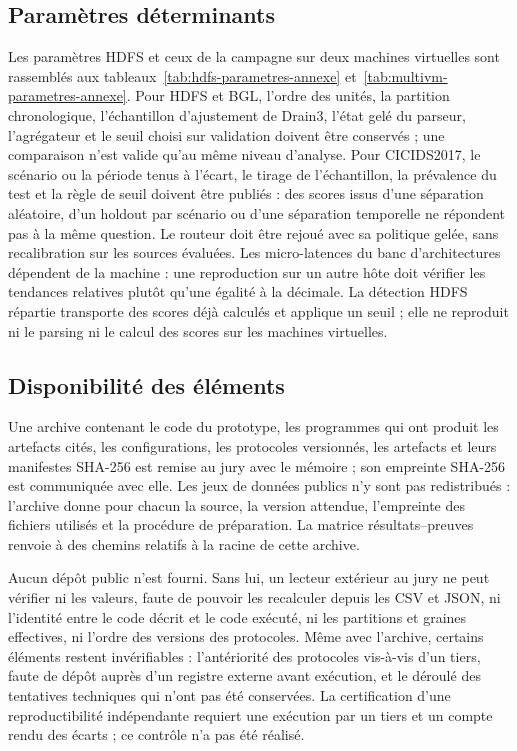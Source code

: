 \subsection{Paramètres déterminants}

Les paramètres HDFS et ceux de la campagne sur deux machines virtuelles sont rassemblés aux
tableaux~\ref{tab:hdfs-parametres-annexe} et~\ref{tab:multivm-parametres-annexe}. Pour HDFS
et BGL, l'ordre des unités, la partition chronologique, l'échantillon d'ajustement de
Drain3, l'état gelé du parseur, l'agrégateur et le seuil choisi sur validation doivent être
conservés ; une comparaison n'est valide qu'au même niveau d'analyse. Pour CICIDS2017, le
scénario ou la période tenus à l'écart, le tirage de l'échantillon, la prévalence du test et
la règle de seuil doivent être publiés : des scores issus d'une séparation aléatoire, d'un
holdout par scénario ou d'une séparation temporelle ne répondent pas à la même question. Le
routeur doit être rejoué avec sa politique gelée, sans recalibration sur les sources
évaluées. Les micro-latences du banc d'architectures dépendent de la machine : une
reproduction sur un autre hôte doit vérifier les tendances relatives plutôt qu'une égalité à
la décimale. La détection HDFS répartie transporte des scores déjà calculés et applique un
seuil ; elle ne reproduit ni le parsing ni le calcul des scores sur les machines virtuelles.

\subsection{Disponibilité des éléments}
\label{sec:disponibilite}

Une archive contenant le code du prototype, les programmes qui ont produit les artefacts
cités, les configurations, les protocoles versionnés, les artefacts et leurs manifestes
SHA-256 est remise au jury avec le mémoire ; son empreinte SHA-256 est communiquée avec
elle. Les jeux de données publics n'y sont pas redistribués : l'archive donne pour chacun la
source, la version attendue, l'empreinte des fichiers utilisés et la procédure de
préparation. La matrice résultats--preuves renvoie à des chemins relatifs à la racine de
cette archive.

Aucun dépôt public n'est fourni. Sans lui, un lecteur extérieur au jury ne peut vérifier ni
les valeurs, faute de pouvoir les recalculer depuis les CSV et JSON, ni l'identité entre le
code décrit et le code exécuté, ni les partitions et graines effectives, ni l'ordre des
versions des protocoles. Même avec l'archive, certains éléments restent invérifiables :
l'antériorité des protocoles vis-à-vis d'un tiers, faute de dépôt auprès d'un registre
externe avant exécution, et le déroulé des tentatives techniques qui n'ont pas été
conservées. La certification d'une reproductibilité indépendante requiert une exécution par
un tiers et un compte rendu des écarts ; ce contrôle n'a pas été réalisé.

